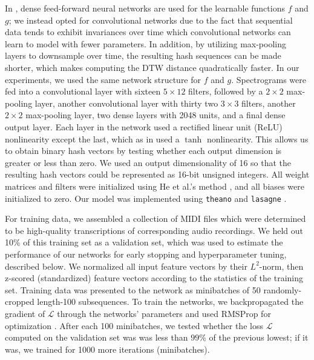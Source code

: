 \documentclass{article} %
\begin{document}
In \cite{masci2014multimodal}, dense feed-forward neural networks are used for the learnable functions $f$ and $g$; we instead opted for convolutional networks due to the fact that sequential data tends to exhibit invariances over time which convolutional networks can learn to model with fewer parameters.
In addition, by utilizing max-pooling layers to downsample over time, the resulting hash sequences can be made shorter, which makes computing the DTW distance quadratically faster.
In our experiments, we used the same network structure for $f$ and $g$.
Spectrograms were fed into a convolutional layer with sixteen $5 \times 12$ filters, followed by a $2\times2$ max-pooling layer, another convolutional layer with thirty two $3\times3$ filters, another $2\times2$ max-pooling layer, two dense layers with 2048 units, and a final dense output layer.
Each layer in the network used a rectified linear unit (ReLU) nonlinearity except the last, which as in \cite{masci2014multimodal} used a $\tanh$ nonlinearity.
This allows us to obtain binary hash vectors by testing whether each output dimension is greater or less than zero.
We used an output dimensionality of 16 so that the resulting hash vectors could be represented as 16-bit unsigned integers.
All weight matrices and filters were initialized using He et al.'s method \cite{he2015delving}, and all biases were initialized to zero.
Our model was implemented using \texttt{theano} \cite{bastien2012theano,bergstra2010theano} and \texttt{lasagne} \cite{dieleman2015lasagne}.

For training data, we assembled a collection of MIDI files which were determined to be high-quality transcriptions of corresponding audio recordings.
We held out 10\% of this training set as a validation set, which was used to estimate the performance of our networks for early stopping and hyperparameter tuning, described below.
We normalized all input feature vectors by their $L^2$-norm, then z-scored (standardized) feature vectors according to the statistics of the training set.
Training data was presented to the network as minibatches of 50 randomly-cropped length-100 subsequences.
To train the networks, we backpropagated the gradient of $\mathcal{L}$ through the networks' parameters and used RMSProp for optimization \cite{tieleman2012lecture}.
After each 100 minibatches, we tested whether the loss $\mathcal{L}$ computed on the validation set was was less than $99\%$ of the previous lowest; if it was, we trained for 1000 more iterations (minibatches).
\end{document}
